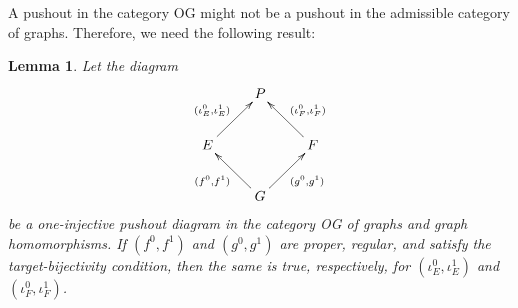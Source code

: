 \documentclass[12pt,times,a4paper]{amsart}
\newtheorem{lemma}[theorem]{Lemma}
\numberwithin{equation}{section}
\numberwithin{equation}{section}
\begin{document}
A pushout in the category {\rm OG} might not be a pushout in the admissible category of graphs. 
Therefore, we need the following result:
\begin{lemma}\label{admpush}
Let the diagram
\begin{equation*}
\xymatrix{
&
P
&\\
E
\ar[ur]^{(\iota^0_E,\iota^1_E)}& & 
F
\ar[ul]_{(\iota^0_F,\iota^1_F)}\\
&
G
\ar[ur]_{(g^0,g^1)}\ar[ul]^{(f^0,f^1)}&
}
\end{equation*}
be a one-injective pushout diagram in the category {\rm OG} of graphs and graph homomorphisms. 
If $(f^0,f^1)$ and $(g^0,g^1)$ are proper, regular, and
satisfy the target-bijectivity condition, then the same is true, respectively, for $(\iota_E^0,\iota_E^1)$ and $(\iota_F^0,\iota_F^1)$.
\end{lemma}
\end{document}
